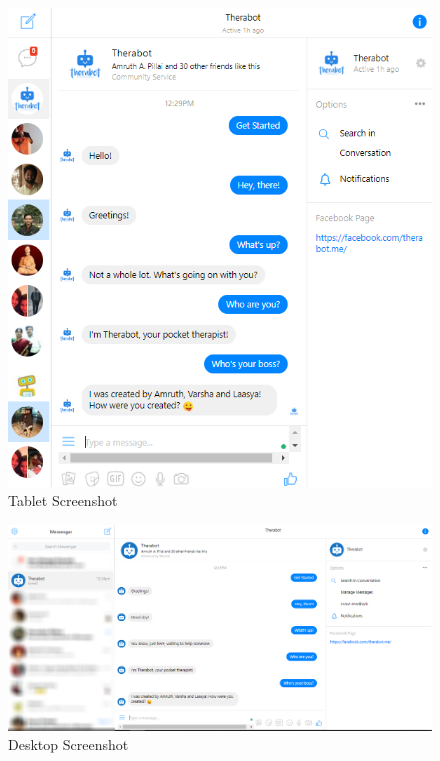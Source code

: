 \vspace*{\fill}
\begin{figure}[H]
    \centering
    \includegraphics[width=12cm]{images/screenshots/chatbot/tablet.png}
    \caption{Tablet Screenshot}
\end{figure}

\begin{figure}[H]
    \centering
    \includegraphics[width=\textwidth]{images/screenshots/chatbot/desktop.png}
    \caption{Desktop Screenshot}
\end{figure}
\vspace*{\fill}
